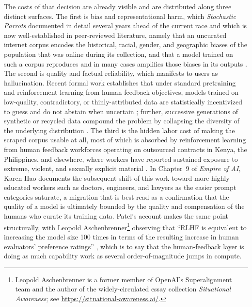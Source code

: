 \documentclass[10pt,a4paper,twocolumn]{article}
\begin{document}
The costs of that decision are already visible and are distributed along three distinct surfaces. The first is bias and representational harm, which \emph{Stochastic Parrots} documented in detail several years ahead of the current race and which is now well-established in peer-reviewed literature, namely that an uncurated internet corpus encodes the historical, racial, gender, and geographic biases of the population that was online during its collection, and that a model trained on such a corpus reproduces and in many cases amplifies those biases in its outputs \citep{bender2021parrots}. The second is quality and factual reliability, which manifests to users as hallucination. Recent formal work establishes that under standard pretraining and reinforcement learning from human feedback objectives, models trained on low-quality, contradictory, or thinly-attributed data are statistically incentivized to guess and do not abstain when uncertain \citep{kalai2025whyhallucinate}; further, successive generations of synthetic or recycled data compound the problem by collapsing the diversity of the underlying distribution \citep{shumailov2024modelcollapse}. The third is the hidden labor cost of making the scraped corpus usable at all, most of which is absorbed by reinforcement learning from human feedback workforces operating on outsourced contracts in Kenya, the Philippines, and elsewhere, where workers have reported sustained exposure to extreme, violent, and sexually explicit material \citep[ch.~9]{hao2025empire}. In Chapter~9 of \emph{Empire of AI}, Karen Hao documents the subsequent shift of this work toward more highly-educated workers such as doctors, engineers, and lawyers as the easier prompt categories saturate, a migration that is best read as a confirmation that the quality of a model is ultimately bounded by the quality and compensation of the humans who curate its training data. Patel's account makes the same point structurally, with Leopold Aschenbrenner\footnote{Leopold Aschenbrenner is a former member of OpenAI's Superalignment team and the author of the widely-circulated essay collection \emph{Situational Awareness}; see \url{https://situational-awareness.ai/}.} observing that ``RLHF is equivalent to increasing the model size 100 times in terms of the resulting increase in human evaluators' preference ratings'' \citep[p.~35]{patel2025scaling}, which is to say that the human-feedback layer is doing as much capability work as several order-of-magnitude jumps in compute.
\end{document}
